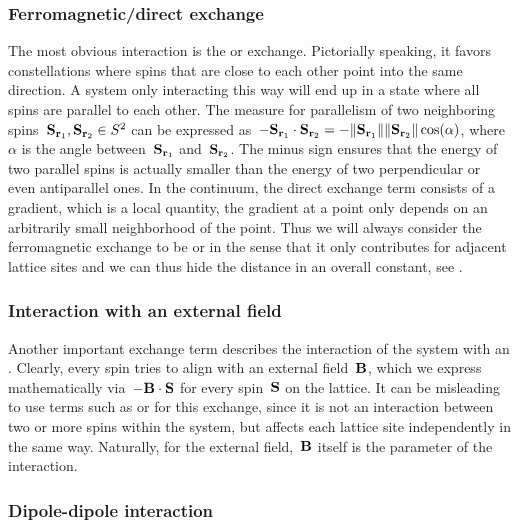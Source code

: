 \subsubsection{Ferromagnetic/direct exchange}

The most obvious interaction is the  or 
exchange.  Pictorially speaking, it favors constellations where spins that are
close to each other point into the same direction. A system only interacting
this way will end up in a state where all spins are parallel to each other. The
measure for parallelism of two neighboring spins~$\S_{\r_1}, \S_{\r_2} \in S^2$
can be expressed as~$- \S_{\r_1} \cdot \S_{\r_2} = - \norm{\S_{\r_1}}
\norm{\S_{\r_2}} \cos(\alpha)$, where~$\alpha$ is the angle between~$\S_{\r_1}$
and~$\S_{\r_2}$. The minus sign ensures that the energy of two parallel spins is
actually smaller than the energy of two perpendicular or even antiparallel ones.
In the continuum, the direct exchange term consists of a gradient, which is a
local quantity, \ie{} the gradient at a point only depends on an arbitrarily
small neighborhood of the point. Thus we will always consider the ferromagnetic
exchange to be  or  in the sense that it
only contributes for adjacent lattice sites and we can thus hide the distance in
an overall constant, see .

\subsubsection{Interaction with an external field}

Another important exchange term describes the interaction of the system with an
. Clearly, every spin tries to align with an
external field~$\B$, which we express mathematically via~$-\B \cdot \S$ for
every spin~$\S$ on the lattice. It can be misleading to use terms such as
 or  for this exchange, since it is not
an interaction between two or more spins within the system, but affects each
lattice site independently in the same way. Naturally, for the external
field,~$\B$ itself is the parameter of the interaction.

\subsubsection{Dipole-dipole interaction}

